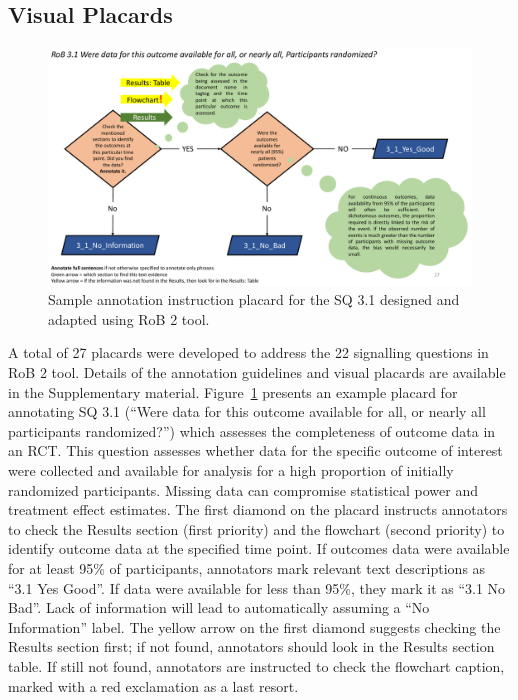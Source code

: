 \documentclass[sn-mathphys,Numbered]{sn-jnl}%
\theoremstyle{thmstyleone}%
\theoremstyle{thmstyletwo}%
\theoremstyle{thmstylethree}%
\begin{document}
\subsection{Visual Placards}
\label{result:placards}
%
%
%
%
\begin{figure}
    \centering
    \includegraphics[width=0.80\columnwidth]{figures/placard_3_1.pdf}
    \caption{Sample annotation instruction placard for the SQ 3.1 designed and adapted using RoB 2 tool.}
    \label{fig:placard}
\end{figure}
%
%
%
A total of 27 placards were developed to address the 22 signalling questions in RoB 2 tool. 
Details of the annotation guidelines and visual placards are available in the Supplementary material.
Figure~\ref{fig:placard} presents an example placard for annotating SQ 3.1 (``Were data for this outcome available for all, or nearly all participants randomized?'') which assesses the completeness of outcome data in an RCT.
This question assesses whether data for the specific outcome of interest were collected and available for analysis for a high proportion of initially randomized participants.
Missing data can compromise statistical power and treatment effect estimates. 
The first diamond on the placard instructs annotators to check the Results section (first priority) and the flowchart (second priority) to identify outcome data at the specified time point.
If outcomes data were available for at least 95\% of participants, annotators mark relevant text descriptions as ``3.1 Yes Good''.
If data were available for less than 95\%, they mark it as ``3.1 No Bad''.
Lack of information will lead to automatically assuming a ``No Information'' label.
The yellow arrow on the first diamond suggests checking the Results section first; if not found, annotators should look in the Results section table.
If still not found, annotators are instructed to check the flowchart caption, marked with a red exclamation as a last resort.
%
%
%
\end{document}
